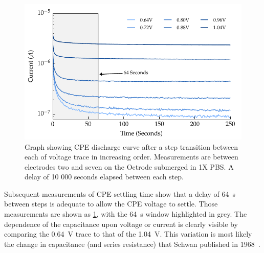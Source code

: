        \begin{figure}
          \centering
          \includegraphics{content/pt2/08-InterfaceParameters/graphics/graph_CPE_currentVsTime_thesis}
          \caption{\label{fig:graph_CPE_currentVsTime}Graph showing CPE discharge curve after a step transition between each of voltage trace in increasing order. Measurements are between electrodes two and seven on the Octrode submerged in 1X PBS. A delay of 10 000 seconds elapsed between each step.}
        \end{figure}
        Subsequent measurements of CPE settling time show that a delay of \SI{64}{\second} between steps is adequate to allow the CPE voltage to settle.
        Those measurements are shown as \cref{fig:graph_CPE_currentVsTime}, with the \SI{64}{\second} window highlighted in grey.
        The dependence of the capacitance upon voltage or current is clearly visible by comparing the \SI{0.64}{\volt} trace to that of the \SI{1.04}{\volt}.
        This variation is most likely the change in capacitance (and series resistance) that Schwan published in 1968~\cite{Schwan1968}.

